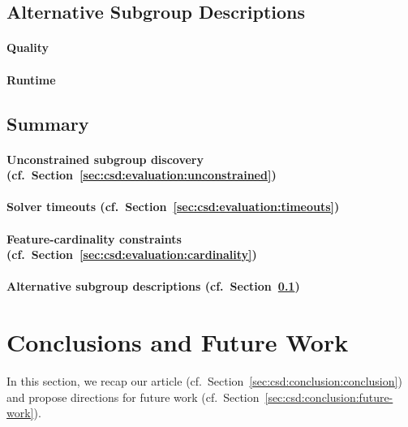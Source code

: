 \documentclass{article}
\theoremstyle{definition}
\begin{document}
\subsection{Alternative Subgroup Descriptions}
\label{sec:csd:evaluation:alternatives}

\paragraph{Quality}

\paragraph{Runtime}

\subsection{Summary}
\label{sec:csd:evaluation:summary}

\paragraph{Unconstrained subgroup discovery (cf.~Section~\ref{sec:csd:evaluation:unconstrained})}

\paragraph{Solver timeouts (cf.~Section~\ref{sec:csd:evaluation:timeouts})}

\paragraph{Feature-cardinality constraints (cf.~Section~\ref{sec:csd:evaluation:cardinality})}

\paragraph{Alternative subgroup descriptions (cf.~Section~\ref{sec:csd:evaluation:alternatives})}

\section{Conclusions and Future Work}
\label{sec:csd:conclusion}

In this section, we recap our article (cf.~Section~\ref{sec:csd:conclusion:conclusion}) and propose directions for future work (cf.~Section~\ref{sec:csd:conclusion:future-work}).
\end{document}
